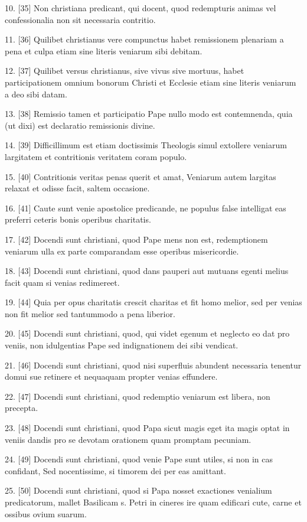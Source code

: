 10. [35] Non christiana predicant, qui docent, quod redempturis animas
vel confessionalia non sit necessaria contritio.

11. [36] Quilibet christianus vere compunctus habet remissionem
plenariam a pena et culpa etiam sine literis veniarum sibi debitam.

12. [37] Quilibet versus christianus, sive vivus sive mortuus, habet
participationem omnium bonorum Christi et Ecclesie etiam sine literis
veniarum a deo sibi datam.

13. [38] Remissio tamen et participatio Pape nullo modo est
contemnenda, quia (ut dixi) est declaratio remissionis divine.

14. [39] Difficillimum est etiam doctissimis Theologis simul extollere
veniarum largitatem et contritionis veritatem coram populo.

15. [40] Contritionis veritas penas querit et amat, Veniarum autem
largitas relaxat et odisse facit, saltem occasione.

16. [41] Caute sunt venie apostolice predicande, ne populus false
intelligat eas preferri ceteris bonis operibus charitatis.

17. [42] Docendi sunt christiani, quod Pape mens non est, redemptionem
veniarum ulla ex parte comparandam esse operibus misericordie.

18. [43] Docendi sunt christiani, quod dans pauperi aut mutuans egenti
melius facit quam si venias redimereet.

19. [44] Quia per opus charitatis crescit charitas et fit homo melior,
sed per venias non fit melior sed tantummodo a pena liberior.

20. [45] Docendi sunt christiani, quod, qui videt egenum et neglecto eo
dat pro veniis, non idulgentias Pape sed indignationem dei sibi
vendicat.

21. [46] Docendi sunt christiani, quod nisi superfluis abundent
necessaria tenentur domui sue retinere et nequaquam propter venias
effundere.

22. [47] Docendi sunt christiani, quod redemptio veniarum est libera,
non precepta.

23. [48] Docendi sunt christiani, quod Papa sicut magis eget ita magis
optat in veniis dandis pro se devotam orationem quam promptam pecuniam.

24. [49] Docendi sunt christiani, quod venie Pape sunt utiles, si non
in cas confidant, Sed nocentissime, si timorem dei per eas amittant.

25. [50] Docendi sunt christiani, quod si Papa nosset exactiones
venialium predicatorum, mallet Basilicam s. Petri in cineres ire quam
edificari cute, carne et ossibus ovium suarum.

